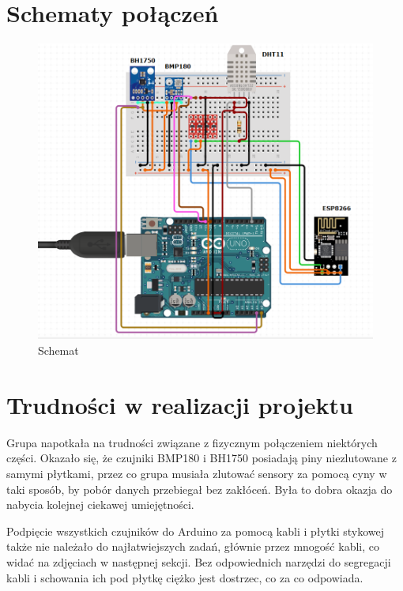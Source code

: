 \documentclass[polish, 11pt]{article}
\begin{document}
\vspace{1cm}
\section{Schematy połączeń}
\begin{figure}[H]
    \centering
    \includegraphics[scale=0.8]{schemat.png}
\caption{Schemat}
\end{figure}

\vspace{1cm}
\section{Trudności w realizacji projektu}
Grupa napotkała na trudności związane z fizycznym połączeniem niektórych części. Okazało się, że czujniki BMP180 i BH1750 posiadają piny niezlutowane z samymi płytkami, przez co grupa musiała zlutować sensory za pomocą cyny w taki sposób, by pobór danych przebiegał bez zakłóceń. Była to dobra okazja do nabycia kolejnej ciekawej umiejętności. 
\par Podpięcie wszystkich czujników do Arduino za pomocą kabli i płytki stykowej także nie należało do najłatwiejszych zadań, głównie przez mnogość kabli, co widać na zdjęciach w następnej sekcji. Bez odpowiednich narzędzi do segregacji kabli i schowania ich pod płytkę ciężko jest dostrzec, co za co odpowiada. 

\vspace{1cm}
\end{document}

